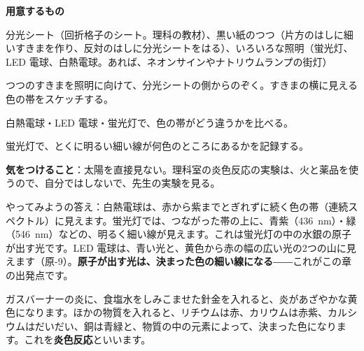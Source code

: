 \begin{yattemiyou}
\textbf{用意するもの}\par
分光シート（回折格子のシート。理科の教材）、黒い紙のつつ（片方のはしに細いすきまを作り、反対のはしに分光シートをはる）、いろいろな照明（蛍光灯、LED 電球、白熱電球。あれば、ネオンサインやナトリウムランプの街灯）\par\vspace{2pt}
\begin{enumerate}[label={\bkcircled[bkGreen]{\arabic*}}, leftmargin=2.4\zw, itemsep=1pt, topsep=0pt]
\item つつのすきまを照明に向けて、分光シートの側からのぞく。すきまの横に見える色の帯をスケッチする。
\item 白熱電球・LED 電球・蛍光灯で、色の帯がどう違うかを比べる。
\item 蛍光灯で、とくに明るい細い線が何色のところにあるかを記録する。
\end{enumerate}
\textbf{気をつけること}：太陽を直接見ない。理科室の炎色反応の実験は、火と薬品を使うので、自分ではしないで、先生の実験を見る。
\end{yattemiyou}

\noindent やってみようの答え：白熱電球は、赤から紫までとぎれずに続く色の帯（連続スペクトル）に見えます。蛍光灯では、つながった帯の上に、青紫（\qty{436}{nm}）・緑（\qty{546}{nm}）などの、明るく細い線が見えます。これは蛍光灯の中の水銀の原子が出す光です。LED 電球は、青い光と、黄色から赤の幅の広い光の2つの山に見えます（原-9）。\textbf{原子が出す光は、決まった色の細い線になる}――これがこの章の出発点です。

\begin{omoidasou}
\end{omoidasou}


\label{ph:原-4:sec1}
ガスバーナーの炎に、食塩水をしみこませた針金を入れると、炎があざやかな黄色になります。ほかの物質を入れると、リチウムは赤、カリウムは赤紫、カルシウムはだいだい、銅は青緑と、物質の中の元素によって、決まった色になります。これを\textbf{炎色反応}といいます。

